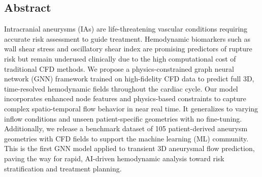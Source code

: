 \subsection*{Abstract}
Intracranial aneurysms (IAs) are life-threatening vascular conditions requiring accurate risk assessment to guide treatment. Hemodynamic biomarkers such as wall shear stress and oscillatory shear index are promising predictors of rupture risk but remain underused clinically due to the high computational cost of traditional CFD methods. We propose a physics-constrained graph neural network (GNN) framework trained on high-fidelity CFD data to predict full 3D, time-resolved hemodynamic fields throughout the cardiac cycle. Our model incorporates enhanced node features and physics-based constraints to capture complex spatio-temporal flow behavior in near real time. It generalizes to varying inflow conditions and unseen patient-specific geometries with no fine-tuning. Additionally, we release a benchmark dataset of 105 patient-derived aneurysm geometries with CFD fields to support the machine learning (ML) community. This is the first GNN model applied to transient 3D aneurysmal flow prediction, paving the way for rapid, AI-driven hemodynamic analysis toward risk stratification and treatment planning.
